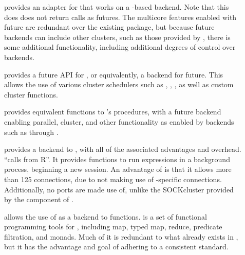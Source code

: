 \begin{description}
    \item[]
        \textcite{bengtsson20do} provides an adapter for \cite{microsoft20}
        that works on a -based backend. Note that this does does not
        return  calls as futures. The multicore features enabled with
        future are redundant over the existing  package, but because
        future backends can include other clusters, such as those provided by
        , there is some additional functionality, including additional
        degrees of control over backends.
    \item[]
        \cite{bengtsson19batch} provides a future API for
        \cite{lang17}, or equivalently, a  backend for
        future. This allows the use of various cluster schedulers such as
        , , , as well as custom cluster functions.
    \item[]
        \textcite{bengtsson20apply} provides equivalent functions to \R{}'s
         procedures, with a future backend enabling parallel,
        cluster, and other functionality as enabled by backends such as
         through .
    \item[]
        \textcite{bengtsson19callr} provides a \cite{csardi20} backend to
        , with all of the associated advantages and overhead. 
        ``calls \R{} from R''. It provides functions to run expressions in a
        background \R{} process, beginning a new session. An advantage of  is
        that it allows more than 125 connections, due to not making use of
        \R{}-specific connections. Additionally, no ports are made use of, unlike
        the SOCKcluster provided by the  component of .
    \item[]
        \textcite{vaughan18} allows the use of  as a backend to 
        functions.  is a set of functional programming tools for \R{},
        including map, typed map, reduce, predicate filtration, and monads. Much of it is
        redundant to what already exists in \R{}, but it has the advantage and goal
        of adhering to a consistent standard.
\end{description}

